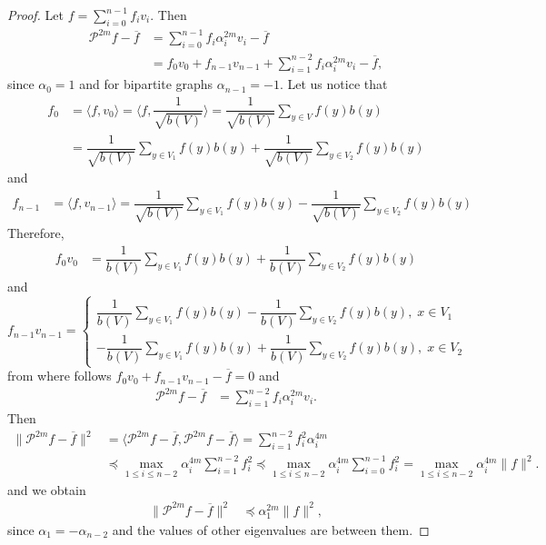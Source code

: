 \documentclass[a4paper,12pt]{amsart}
\theoremstyle{definition}
\renewcommand{\P}{\mathcal{P}}
\newcommand{\weight}{b}
\begin{document}
\begin{proof}
Let $f=\sum_{i=0}^{n-1}f_i v_i$. Then 
\begin{align*}
\P^{2m} f-\overline f&=\sum\limits_{i=0}^{n-1}f_i\alpha_i^{2m} v_i-\overline f\\
&=f_0v_0+f_{n-1}v_{n-1}+\sum\limits_{i=1}^{n-2}f_i\alpha_i^{2m} v_i-\overline f,
\end{align*}
since $\alpha_0=1$ and for bipartite graphs $\alpha_{n-1}=-1$.
Let us notice that 
\begin{align*}
f_0&=\langle f,v_0\rangle=\langle f, \dfrac{1}{\sqrt{\weight (V)}}\rangle=\dfrac{1}{\sqrt{\weight (V)}} \sum_{y\in V} f(y)\weight (y)\\
&=\dfrac{1}{\sqrt{\weight (V)}} \sum_{y\in V_1} f(y)\weight (y)+\dfrac{1}{\sqrt{\weight (V)}} \sum_{y\in V_2} f(y)\weight (y)
\end{align*}
and
\begin{align*}
f_{n-1}&=\langle f,v_{n-1}\rangle=\dfrac{1}{\sqrt{\weight (V)}} \sum_{y\in V_1} f(y)\weight (y)-\dfrac{1}{\sqrt{\weight (V)}} \sum_{y\in V_2} f(y)\weight (y)
\end{align*}
Therefore,
\begin{align*}
f_0v_0&=\dfrac{1}{{\weight (V)}} \sum_{y\in V_1} f(y)\weight (y)+\dfrac{1}{{\weight (V)}} \sum_{y\in V_2} f(y)\weight (y)
\end{align*}
and
\begin{equation*}
f_{n-1}v_{n-1}=
\begin{cases*}
\dfrac{1}{{\weight (V)}} \sum_{y\in V_1} f(y)\weight (y)-\dfrac{1}{{\weight (V)}} \sum_{y\in V_2} f(y)\weight (y),\; x \in V_1\\
-\dfrac{1}{{\weight (V)}} \sum_{y\in V_1} f(y)\weight (y)+\dfrac{1}{{\weight (V)}} \sum_{y\in V_2} f(y)\weight (y),\; x \in V_2
\end{cases*}
\end{equation*}
from where follows $f_0v_0+f_{n-1}v_{n-1}-\overline f=0$ and 
\begin{align*}
\P^{2m} f-\overline f&=\sum\limits_{i=1}^{n-2}f_i\alpha_i^{2m} v_i.
\end{align*}
Then 
\begin{align*}
\|\P^{2m} f-\overline f\|^2&=\langle \P^{2m} f-\overline f, \P^{2m} f-\overline f\rangle=\sum\limits_{i=1}^{n-2}f_i^2\alpha_i^{4m}\\
&\preceq \max_{1\le i\le n-2} \alpha_i^{4m}\sum\limits_{i=1}^{n-2}f_i^2\preceq \max_{1\le i\le n-2} \alpha_i^{4m}\sum\limits_{i=0}^{n-1}f_i^2=\max_{1\le i\le n-2} \alpha_i^{4m}\|f\|^2.
\end{align*}
and we obtain
\begin{align*}
\|\P^{2m} f-\overline f\|^2&\preceq \alpha_1^{2m}\|f\|^2,
\end{align*}
since $\alpha_1=-\alpha_{n-2}$ and the values of other eigenvalues are between them.
\end{proof}
\end{document}
